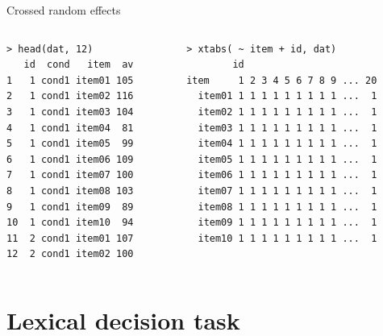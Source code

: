 \documentclass[aspectratio=169]{beamer}
\begin{document}
\begin{frame}[fragile]{Crossed random effects}
  \vspace{-.6cm}
  \begin{columns}
    \begin{column}[t]{4.5cm}
  \begin{lstlisting}
> head(dat, 12)
   id  cond   item  av
1   1 cond1 item01 105
2   1 cond1 item02 116
3   1 cond1 item03 104
4   1 cond1 item04  81
5   1 cond1 item05  99
6   1 cond1 item06 109
7   1 cond1 item07 100
8   1 cond1 item08 103
9   1 cond1 item09  89
10  1 cond1 item10  94
11  2 cond1 item01 107
12  2 cond1 item02 100
  \end{lstlisting}
    \end{column}

    \begin{column}[t]{7cm}
  \begin{lstlisting}
> xtabs( ~ item + id, dat)
        id
item     1 2 3 4 5 6 7 8 9 ... 20
  item01 1 1 1 1 1 1 1 1 1 ...  1
  item02 1 1 1 1 1 1 1 1 1 ...  1
  item03 1 1 1 1 1 1 1 1 1 ...  1
  item04 1 1 1 1 1 1 1 1 1 ...  1
  item05 1 1 1 1 1 1 1 1 1 ...  1
  item06 1 1 1 1 1 1 1 1 1 ...  1
  item07 1 1 1 1 1 1 1 1 1 ...  1
  item08 1 1 1 1 1 1 1 1 1 ...  1
  item09 1 1 1 1 1 1 1 1 1 ...  1
  item10 1 1 1 1 1 1 1 1 1 ...  1
  \end{lstlisting}
    \end{column}
  \end{columns}
\end{frame}

\section{Lexical decision task}
\end{document}
